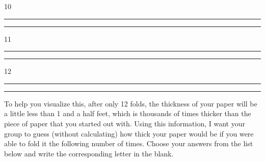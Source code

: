 \documentclass{article}
\begin{document}
\vspace{0.1in}

10 \hspace{1.25in}  \rule{0.5in}{0.01in} \hspace{1.7in} \rule{0.5in}{0.01in}

\vspace{0.1in}

11 \hspace{1.25in}  \rule{0.5in}{0.01in} \hspace{1.7in} \rule{0.5in}{0.01in}

\vspace{0.1in}

12 \hspace{1.25in}  \rule{0.5in}{0.01in} \hspace{1.7in} \rule{0.5in}{0.01in}

\vspace{.3in}

To help you visualize this, after only 12 folds, the thickness of your paper will be a little less than 1 and a half feet, which is thousands of times thicker than the piece of paper that you started out with. Using this information, I want your group to guess (without calculating) how thick your paper would be if you were able to fold it the following number of times. Choose your answers from the list below and write the corresponding letter in the blank.

\vspace{0.1in}
\end{document}
